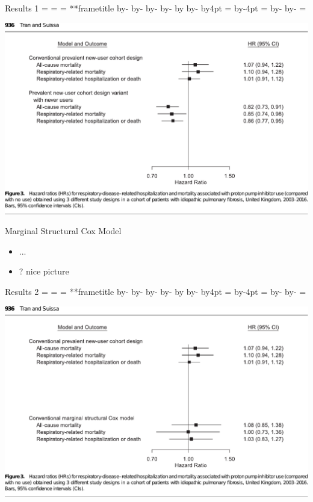 \documentclass[aspectratio=169,12pt]{beamer} %
\makeatletter
\newif\ifsidebartheme
\newcommand*{\calculatespace}{%
    \contentheight=\paperheight%
    \ifx\beamer@frametitle\@empty%
        \setbox\@tempboxa=\box\voidb@x%
      \else%
        \setbox\@tempboxa=\vbox{%
          \vbox{}%
          {\parskip0pt\usebeamertemplate***{frametitle}}%
        }%
        \ifsidebartheme%
          \advance\contentheight by-1em%
        \fi%
      \fi%
    \advance\contentheight by-\ht\@tempboxa%
    \advance\contentheight by-\dp\@tempboxa%
    \advance\contentheight by-\beamer@frametopskip%
    \ifbeamer@plainframe%
    \contentbottom=0pt%
    \else%
    \advance\contentheight by-\headheight%
    \advance\contentheight by\headdp%
    \advance\contentheight by-\footheight%
    \advance\contentheight by4pt%
    \contentbottom=\footheight%
    \advance\contentbottom by-4pt%
    \fi%
    \contentwidth=\paperwidth%
    \ifbeamer@plainframe%
    \contentleft=0pt%
    \else%
    \advance\contentwidth by-\beamer@rightsidebar%
    \advance\contentwidth by-\beamer@leftsidebar\relax%
    \contentleft=\beamer@leftsidebar%
    \fi%
}
\makeatother
\begin{document}
\begin{frame}{Results 1}
    \calculatespace%
    \begin{center}
	\includegraphics[height=0.90\contentheight]{ref/suissa-fig3-pnuc.pdf}
    \end{center}
\end{frame}

\begin{frame}{Marginal Structural Cox Model}
    \begin{itemize}
	\item ...
	\item ? nice picture
    \end{itemize}
\end{frame}

\begin{frame}{Results 2}
    \calculatespace%
    \begin{center}
	\includegraphics[height=0.90\contentheight]{ref/suissa-fig3-mscm.pdf}
    \end{center}
\end{frame}
\end{document}
